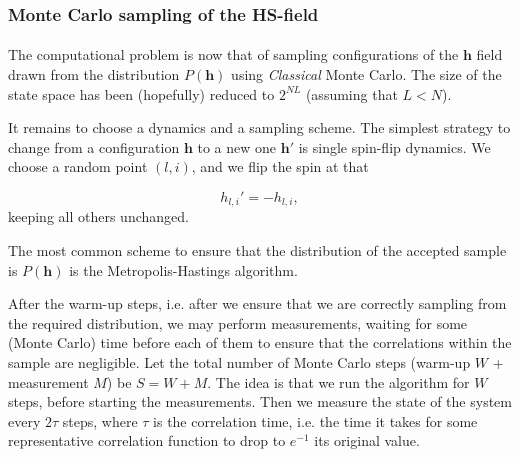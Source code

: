 \documentclass[10pt, twocolumn, twoside]{article}
\begin{document}
\subsubsection{Monte Carlo sampling of the HS-field}\paragraph{}

The computational problem is now that of sampling configurations of the $\bm h$ field drawn from the distribution $P(\bm h)$ using \emph{Classical} Monte Carlo. The size of the state space has been (hopefully) reduced to $2^{NL}$ (assuming that $L < N$).

It remains to choose a dynamics and a sampling scheme. The simplest strategy to change from a configuration $\bm h$ to a new one $\bm h'$ is single spin-flip dynamics. We choose a random point $(l, i)$, and we flip the spin at that 

\begin{equation}
h_{l, i}' = - h_{l, i},
\end{equation}
keeping all others unchanged.

The most common scheme to ensure that the distribution of the accepted sample is $P(\bm h)$ is the Metropolis-Hastings algorithm.

After the warm-up steps, i.e. after we ensure that we are correctly sampling from the required distribution, we may perform measurements, waiting for some (Monte Carlo) time before each of them to ensure that the correlations within the sample are negligible. Let the total number of Monte Carlo steps (warm-up $W$ + measurement $M$) be $S = W + M$. The idea is that we run the algorithm for $W$ steps, before starting the measurements. Then we measure the state of the system every $2\tau$ steps, where $\tau$ is the correlation time, i.e. the time it takes for some representative correlation function to drop to $e^{-1}$ its original value.
\end{document}
